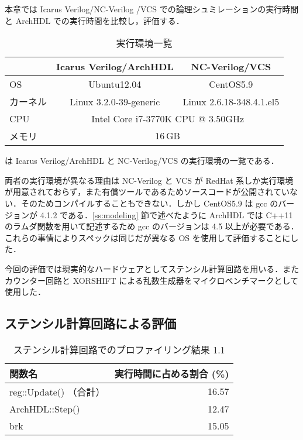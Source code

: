 本章では Icarus Verilog/NC-Verilog \cite{ncverilog}/VCS \cite{vcs}
での論理シュミレーションの実行時間と ArchHDL
での実行時間を比較し，評価する．

\begin{table}[t]
 \caption{実行環境一覧}
 \label{table:exec_env}
 \begin{center}
  \begin{tabular}{lcc} \toprule
         &  Icarus Verilog/ArchHDL  &  NC-Verilog/VCS   \\ \midrule
  OS     &  Ubuntu12.04             &  CentOS5.9        \\
  カーネル &  Linux 3.2.0-39-generic  &  Linux 2.6.18-348.4.1.el5   \\
  CPU    &  \multicolumn{2}{c}{Intel Core i7-3770K CPU @ 3.50GHz}   \\
  メモリ  &  \multicolumn{2}{c}{$16\,\mathrm{GB}$}  \\ \bottomrule
  \end{tabular}
 \end{center}
\end{table}

 は Icarus Verilog/ArchHDL と NC-Verilog/VCS
の実行環境の一覧である．

両者の実行環境が異なる理由は NC-Verilog と VCS が RedHat
系しか実行環境が用意されておらず，また有償ツールであるためソースコードが公開されていない．そのためコンパイルすることもできない．しかし
CentOS5.9 は gcc のバージョンが 4.1.2 である．\ref{ss:modeling}
節で述べたように ArchHDL では C++11 のラムダ関数を用いて記述するため gcc
のバージョンは 4.5
以上が必要である．これらの事情によりスペックは同じだが異なる OS
を使用して評価することにした．

今回の評価では現実的なハードウェアとしてステンシル計算回路を用いる．またカウンター回路と
XORSHIFT による乱数生成器をマイクロベンチマークとして使用した．

\subsection{ステンシル計算回路による評価}


\begin{table}[t]
 \caption{ステンシル計算回路でのプロファイリング結果 1.1}
 \label{table:stencil_prof1.1}
 \begin{center}
  \begin{tabular}{lr} \toprule
  関数名 & 実行時間に占める割合 (\%) \\ \midrule
  reg::Update() （合計） & 16.57 \\
  ArchHDL::Step() & 12.47 \\
  brk & 15.05 \\ \bottomrule
  \end{tabular}
 \end{center}
\end{table}

